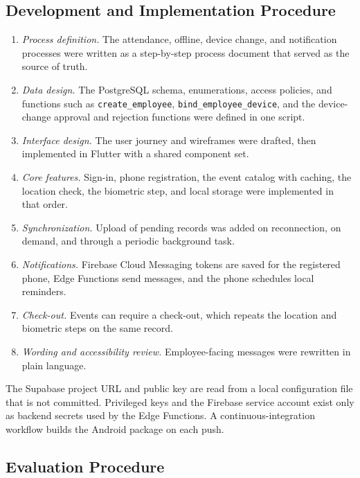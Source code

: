 \documentclass[conference]{IEEEtran}
\begin{document}
\subsection{Development and Implementation Procedure}

\begin{enumerate}
    \item \textit{Process definition.} The attendance, offline, device
    change, and notification processes were written as a step-by-step
    process document that served as the source of truth.
    \item \textit{Data design.} The PostgreSQL schema, enumerations,
    access policies, and functions such as \texttt{create\_employee},
    \texttt{bind\_employee\_device}, and the device-change approval and
    rejection functions were defined in one script.
    \item \textit{Interface design.} The user journey and wireframes
    were drafted, then implemented in Flutter with a shared component
    set.
    \item \textit{Core features.} Sign-in, phone registration, the event
    catalog with caching, the location check, the biometric step, and
    local storage were implemented in that order.
    \item \textit{Synchronization.} Upload of pending records was added
    on reconnection, on demand, and through a periodic background task.
    \item \textit{Notifications.} Firebase Cloud Messaging tokens are
    saved for the registered phone, Edge Functions send messages, and the
    phone schedules local reminders.
    \item \textit{Check-out.} Events can require a check-out, which
    repeats the location and biometric steps on the same record.
    \item \textit{Wording and accessibility review.} Employee-facing
    messages were rewritten in plain language.
\end{enumerate}

The Supabase project URL and public key are read from a local
configuration file that is not committed. Privileged keys and the
Firebase service account exist only as backend secrets used by the Edge
Functions. A continuous-integration workflow builds the Android package
on each push.

\subsection{Evaluation Procedure}
\end{document}

